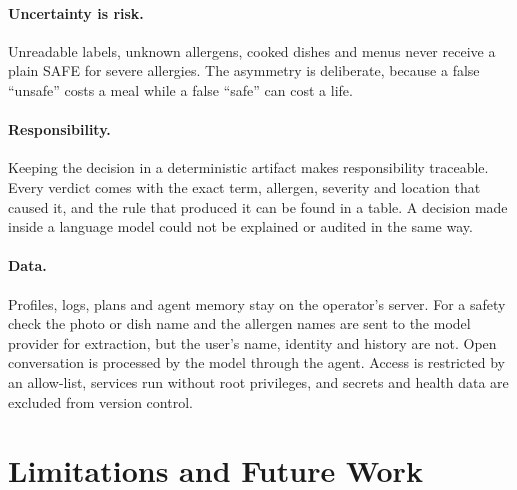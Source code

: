 \documentclass[11pt,a4paper]{article}
\begin{document}
\paragraph{Uncertainty is risk.} Unreadable labels, unknown allergens, cooked dishes and menus never
receive a plain SAFE for severe allergies. The asymmetry is deliberate, because a false ``unsafe'' costs
a meal while a false ``safe'' can cost a life.

\paragraph{Responsibility.} Keeping the decision in a deterministic artifact makes responsibility
traceable. Every verdict comes with the exact term, allergen, severity and location that caused it, and
the rule that produced it can be found in a table. A decision made inside a language model could not be
explained or audited in the same way.

\paragraph{Data.} Profiles, logs, plans and agent memory stay on the operator's server. For a safety
check the photo or dish name and the allergen names are sent to the model provider for extraction, but
the user's name, identity and history are not. Open conversation is processed by the model through the
agent. Access is restricted by an allow-list, services run without root privileges, and secrets and
health data are excluded from version control.

\section{Limitations and Future Work}\label{sec:future}
\end{document}
